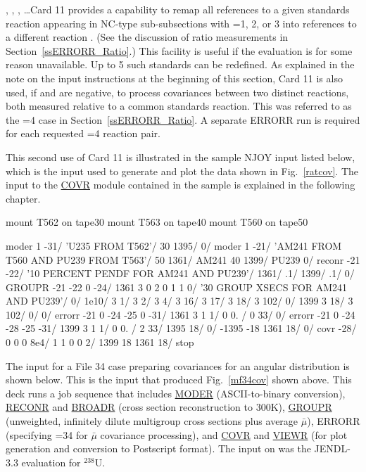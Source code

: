 , , ,  \ldots\hspace{.1in}Card 11
provides a capability to remap all references to a given standards reaction
 appearing in NC-type sub-subsections with
=1, 2, or 3 into references to a different
reaction .  (See the discussion of ratio measurements
in Section~\ref{ssERRORR_Ratio}.)  This facility is useful if the evaluation
 is for some reason unavailable.  Up to 5 such
standards can be redefined.  As explained in the note on the input
instructions at the beginning of this section, Card 11 is also used, if
 and  are negative, to process covariances
between two distinct reactions, both measured relative to a common
standards reaction.  This was referred to as the =4 case
in Section~\ref{ssERRORR_Ratio}.  A separate ERRORR run is required for
each requested =4 reaction pair.

This second use of Card 11 is illustrated in the sample NJOY input
listed below, which is the input used to generate and plot the
data shown in Fig.~\ref{ratcov}.  The input to the
\hyperlink{sCOVRhy}{COVR}
module contained in the sample is explained in the following chapter.

\small
\begin{ccode}

   mount T562 on tape30
   mount T563 on tape40
   mount T560 on tape50

   moder
   1 -31/
   'U235 FROM T562'/
   30 1395/
   0/
   moder
   1 -21/
   'AM241 FROM T560 AND PU239 FROM T563'/
   50 1361/ AM241
   40 1399/ PU239
   0/
   reconr
   -21 -22/
   '10 PERCENT PENDF FOR AM241 AND PU239'/
   1361/
   .1/
   1399/
   .1/
   0/
   GROUPR
   -21 -22 0 -24/
   1361 3 0 2 0 1 1 0/
   '30 GROUP XSECS FOR AM241 AND PU239'/
   0/
   1e10/
   3 1/
   3 2/
   3 4/
   3 16/
   3 17/
   3 18/
   3 102/
   0/
   1399
   3 18/
   3 102/
   0/
   0/
   errorr
   -21 0 -24 -25 0 -31/
   1361 3 1 1/
   0 0. /
   0 33/
   0/
   errorr
   -21 0 -24 -28 -25 -31/
   1399 3 1 1/
   0 0. /
   2 33/
   1395 18/
   0/
   -1395 -18 1361 18/
   0/
   covr
   -28/
   0 0 0 8e4/
   1 1 0 0 2/
   1399 18 1361 18/
   stop

\end{ccode}
\normalsize

The input for a File 34 case preparing covariances for an angular
distribution is shown below.  This is the input that produced
Fig.~\ref{mf34cov} shown above.  This deck runs a job sequence
that includes \hyperlink{sMODERhy}{MODER} (ASCII-to-binary
conversion), \hyperlink{sRECONRhy}{RECONR} and
\hyperlink{sBROADRhy}{BROADR} (cross section reconstruction
to 300K), \hyperlink{sGROUPRhy}{GROUPR}
(unweighted, infinitely dilute multigroup cross sections plus
average $\bar{\mu}$), ERRORR (specifying =34 for
$\bar{\mu}$ covariance processing), and
\hyperlink{sCOVRhy}{COVR} and \hyperlink{sVIEWRhy}{VIEWR} (for plot
generation and conversion to Postscript format).  The input on
 was the JENDL-3.3 evaluation for $^{238}$U.

